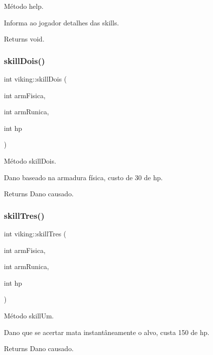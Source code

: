 Método help. 

Informa ao jogador detalhes das skills. \begin{DoxyReturn}{Returns}
void. 
\end{DoxyReturn}
\mbox{\label{classviking_a5d9d645dae5e647b668c57afa0be1cd8}} 
\subsubsection{\texorpdfstring{skill\+Dois()}{skillDois()}}
{\footnotesize\ttfamily int viking\+::skill\+Dois (\begin{DoxyParamCaption}\item[{int}]{arm\+Fisica,  }\item[{int}]{arm\+Runica,  }\item[{int}]{hp }\end{DoxyParamCaption})}



Método skill\+Dois. 

Dano baseado na armadura física, custo de 30 de hp. \begin{DoxyReturn}{Returns}
Dano causado. 
\end{DoxyReturn}
\mbox{\label{classviking_a68c634c68c727ebd2638965b6d393f42}} 
\subsubsection{\texorpdfstring{skill\+Tres()}{skillTres()}}
{\footnotesize\ttfamily int viking\+::skill\+Tres (\begin{DoxyParamCaption}\item[{int}]{arm\+Fisica,  }\item[{int}]{arm\+Runica,  }\item[{int}]{hp }\end{DoxyParamCaption})}



Método skill\+Um. 

Dano que se acertar mata instantâneamente o alvo, custa 150 de hp. \begin{DoxyReturn}{Returns}
Dano causado. 
\end{DoxyReturn}
\mbox{\label{classviking_a433998767ad855cbfa152c1b0f32363e}} 
